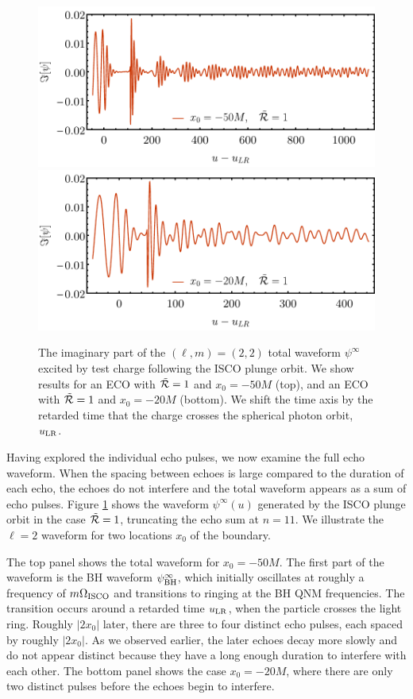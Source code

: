 \begin{refsection}
\begin{figure}[t]
\includegraphics[width = 1 \columnwidth]{chapter_echo/etc/xW50R1plot} \\
\includegraphics[width = 1 \columnwidth]{chapter_echo/etc/xW20R1plot} \\
\caption{
The imaginary part of the $(\ell,m)=(2,2)$ total  waveform $\psi^\infty$ excited by test charge following the ISCO plunge orbit. We show results for an ECO with $\tilde{\mathcal R}=1$ and $x_0 =-50 M$ (top),
and an ECO with $\tilde{\mathcal R}=1$ and $x_0 =-20 M$ (bottom). We shift the time axis by the retarded time that the charge crosses the spherical photon orbit, $u_{\rm LR}$.
}
\label{fig:Esum1}
\end{figure}

Having explored the individual echo pulses, we now examine the full echo waveform.
When the spacing between echoes is large compared to the duration of each echo, the echoes do not interfere and the total waveform appears as a sum of echo pulses. Figure \ref{fig:Esum1} shows the waveform $\psi^\infty(u)$ generated by the ISCO plunge orbit in the case $\tilde{\mathcal R} = 1$, truncating the echo sum at $n=11$. We illustrate the $\ell = 2$ waveform for two locations $x_0$ of the boundary.

The top panel shows the total waveform for $x_0=-50 M$.
The first part of the waveform is the BH waveform $\psi_{\rm BH}^\infty$, which initially oscillates at roughly a frequency of $m\Omega_{\rm ISCO}$ and transitions to ringing at the BH QNM frequencies. 
The transition occurs around a retarded time $u_{\rm LR}$, when the particle crosses the light ring.
Roughly $|2x_0|$ later, there are three to four distinct echo pulses, each spaced by roughly $|2x_0|$. 
As we observed earlier, the later echoes decay more slowly and do not appear distinct because they have a long enough duration to interfere with each other. 
The bottom panel shows the case $x_0=-20 M$, where there are only two distinct pulses before the echoes begin to interfere.


\end{refsection}
